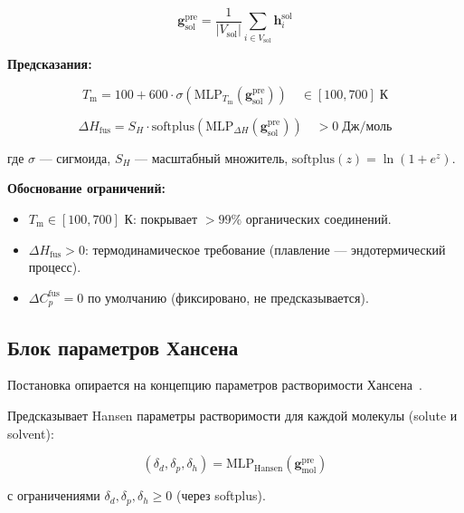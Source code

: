 \documentclass[11pt]{article}
\begin{document}
\begin{equation*}
\mathbf{g}_{\mathrm{sol}}^{\mathrm{pre}} = \frac{1}{|V_{\mathrm{sol}}|}\sum_{i \in V_{\mathrm{sol}}} \mathbf{h}_i^{\mathrm{sol}}
\end{equation*}

\textbf{Предсказания:}

\begin{equation*}
T_{\mathrm{m}} = 100 + 600 \cdot \sigma\!\left(\mathrm{MLP}_{T_{\mathrm{m}}}(\mathbf{g}_{\mathrm{sol}}^{\mathrm{pre}})\right) \quad \in [100, 700] \;\text{К}
\end{equation*}

\begin{equation*}
\Delta H_{\mathrm{fus}} = S_H \cdot \mathrm{softplus}\!\left(\mathrm{MLP}_{\Delta H}(\mathbf{g}_{\mathrm{sol}}^{\mathrm{pre}})\right) \quad > 0 \;\text{Дж/моль}
\end{equation*}

где $\sigma$ --- сигмоида, $S_H$ --- масштабный множитель, $\mathrm{softplus}(z) = \ln(1 + e^z)$.

\textbf{Обоснование ограничений:}

\begin{itemize}
  \item $T_{\mathrm{m}} \in [100, 700]$ К: покрывает $>99\%$ органических соединений.
  \item $\Delta H_{\mathrm{fus}} > 0$: термодинамическое требование (плавление --- эндотермический процесс).
  \item $\Delta C_p^{\mathrm{fus}} = 0$ по умолчанию (фиксировано, не предсказывается).
\end{itemize}

\subsection{Блок параметров Хансена}

Постановка опирается на концепцию параметров растворимости Хансена~\cite{hansen2007}.

Предсказывает Hansen параметры растворимости для каждой молекулы (solute и solvent):

\begin{equation*}
(\delta_d, \delta_p, \delta_h) = \mathrm{MLP}_{\mathrm{Hansen}}(\mathbf{g}_{\mathrm{mol}}^{\mathrm{pre}})
\end{equation*}

с ограничениями $\delta_d, \delta_p, \delta_h \geq 0$ (через softplus).
\end{document}
